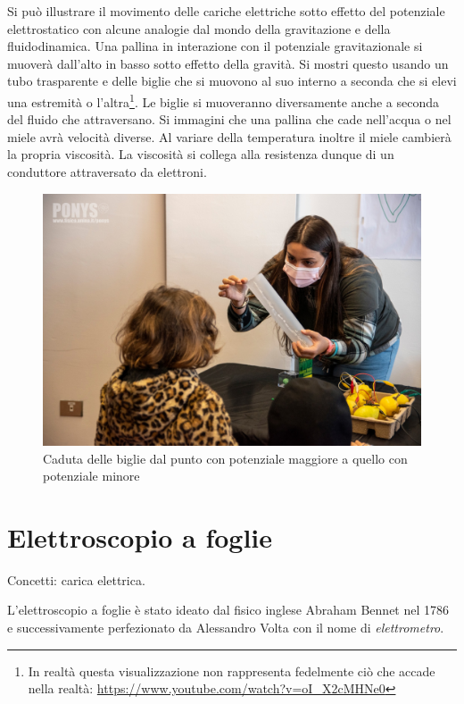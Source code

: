 \documentclass[a4paper]{article}
\begin{document}
Si può illustrare il movimento delle cariche elettriche sotto effetto del
potenziale elettrostatico con alcune analogie dal mondo della gravitazione e
della fluidodinamica. Una pallina in interazione con il potenziale
gravitazionale si muoverà dall'alto in basso sotto effetto della gravità. Si
mostri questo usando un tubo trasparente e delle biglie che si muovono al suo
interno a seconda che si elevi una estremità o l'altra\footnote{ In realtà
  questa visualizzazione non rappresenta fedelmente ciò che accade nella realtà:
  \url{https://www.youtube.com/watch?v=oI_X2cMHNe0} }. Le biglie si muoveranno
diversamente anche a seconda del fluido che attraversano. Si immagini che una
pallina che cade nell'acqua o nel miele avrà velocità diverse. Al variare della
temperatura inoltre il miele cambierà la propria viscosità. La viscosità si
collega alla resistenza dunque di un conduttore attraversato da elettroni.

\begin{figure}[ht]
  \centering
  \includegraphics[width=\linewidth]{figures/tubo}
  \caption{\label{fig:tubo} Caduta delle biglie dal punto con potenziale
    maggiore a quello con potenziale minore}
\end{figure}


\section{Elettroscopio a foglie}%
\label{sec:elettroscopio}

Concetti: carica elettrica.

L'elettroscopio a foglie è stato ideato dal fisico inglese Abraham Bennet nel
1786 e successivamente perfezionato da Alessandro Volta con il nome di
\emph{elettrometro}.
\end{document}
